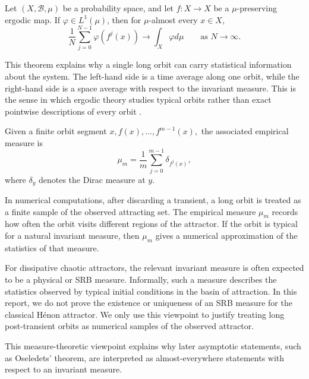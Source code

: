 \begin{theorem}
Let \((X,\mathcal B,\mu)\) be a probability space, and let \(f:X\to X\) be a \(\mu\)-preserving ergodic map. If 
\(\varphi\in L^1(\mu)\), then for \(\mu\)-almost every \(x\in X\),
\[
\frac{1}{N}\sum_{j=0}^{N-1}\varphi(f^j(x))
\to
\int_X \varphi d\mu
\qquad
\text{as } N\to\infty .
\]
\end{theorem}


This theorem explains why a single long orbit can carry statistical information about the system. The left-hand side is a time average along one orbit, while the right-hand side is a space average with respect to the invariant measure. This is the sense in which ergodic theory studies typical orbits rather than exact pointwise descriptions of every orbit \cite{RasmussenErgodic2017,ColoniusKliemann2014}.

\begin{definition}
Given a finite orbit segment
\(
x,f(x),\ldots,f^{m-1}(x),
\)
the associated empirical measure is
\[
\mu_m=\frac{1}{m}\sum_{j=0}^{m-1}\delta_{f^j(x)},\]
where \(\delta_y\) denotes the Dirac measure at \(y\).
\end{definition}

In numerical computations, after discarding a transient, a long orbit is treated as a finite sample of the observed attracting set. The empirical measure \(\mu_m\) records how often the orbit visits different regions of the attractor. If the orbit is typical for a natural invariant measure, then \(\mu_m\) gives a numerical approximation of the statistics of that measure.

\begin{remark}
For dissipative chaotic attractors, the relevant invariant measure is often expected to be a physical or SRB measure. Informally, such a measure describes the statistics observed by typical initial conditions in the basin of attraction. In this report, we do not prove the existence or uniqueness of an SRB measure for the classical Hénon attractor. We only use this viewpoint to justify treating long post-transient orbits as numerical samples of the observed attractor.
\end{remark}

This measure-theoretic viewpoint explains why later asymptotic statements, such as Oseledets' theorem, are interpreted as almost-everywhere statements with respect to an invariant measure.





